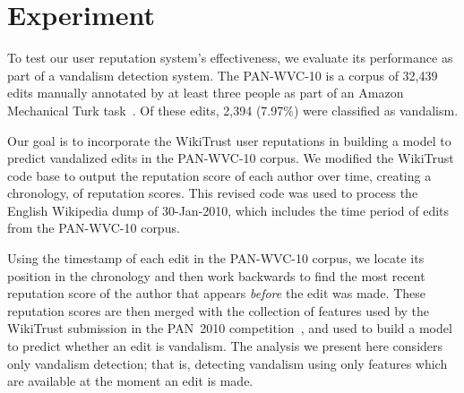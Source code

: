 \section{Experiment}

To test our user reputation system's effectiveness, we
evaluate its performance as part of a vandalism
detection system.
The PAN-WVC-10 is a corpus of 32,439 edits manually
annotated by at least three people as part of an Amazon
Mechanical Turk task~\cite{Potthast2010a}.
Of these edits, 2,394 (7.97\%) were classified as vandalism.

Our goal is to incorporate the WikiTrust user reputations
in building a model to predict vandalized edits in
the PAN-WVC-10 corpus.
We modified the WikiTrust
code base to output the reputation score of each author
over time, creating a chronology, of reputation scores.
This revised code was used to process the English Wikipedia
dump of 30-Jan-2010, which includes the time period of
edits from the PAN-WVC-10 corpus.

Using the timestamp of each edit in the PAN-WVC-10 corpus,
we locate its position in the chronology and then work backwards
to find the most recent reputation score of the author
that appears \textit{before} the edit was made.
These reputation scores are then merged with the collection
of features used by the WikiTrust submission in the PAN~2010
competition~\cite{Adler2010b}, and used to build a model to predict
whether an edit is vandalism.
The analysis we present here considers only  vandalism
detection; that is, detecting vandalism using only features which are
available at the moment an edit is made.


